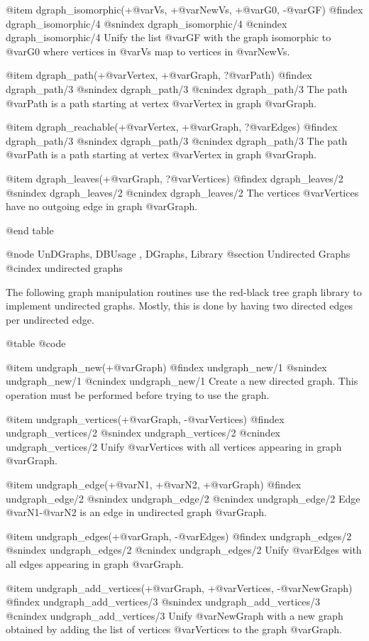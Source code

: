 {{{{{{{{@item dgraph_isomorphic(+@var{Vs}, +@var{NewVs}, +@var{G0}, -@var{GF})
@findex  dgraph_isomorphic/4
@snindex dgraph_isomorphic/4
@cnindex dgraph_isomorphic/4
Unify the list @var{GF} with the graph isomorphic to @var{G0} where 
vertices in @var{Vs} map to vertices in @var{NewVs}.

@item dgraph_path(+@var{Vertex}, +@var{Graph}, ?@var{Path})
@findex  dgraph_path/3
@snindex dgraph_path/3
@cnindex dgraph_path/3
The path @var{Path} is a path starting at vertex @var{Vertex} in graph
@var{Graph}.

@item dgraph_reachable(+@var{Vertex}, +@var{Graph}, ?@var{Edges})
@findex  dgraph_path/3
@snindex dgraph_path/3
@cnindex dgraph_path/3
The path @var{Path} is a path starting at vertex @var{Vertex} in graph
@var{Graph}.

@item dgraph_leaves(+@var{Graph}, ?@var{Vertices})
@findex  dgraph_leaves/2
@snindex dgraph_leaves/2
@cnindex dgraph_leaves/2
The vertices @var{Vertices} have no outgoing edge in graph
@var{Graph}.

@end table

@node UnDGraphs, DBUsage , DGraphs, Library
@section Undirected Graphs
@cindex undirected graphs

The following graph manipulation routines use the red-black tree graph
library to implement undirected graphs. Mostly, this is done by having
two directed edges per undirected edge.

@table @code

@item undgraph_new(+@var{Graph})
@findex  undgraph_new/1
@snindex undgraph_new/1
@cnindex undgraph_new/1
Create a new directed graph. This operation must be performed before
trying to use the graph.

@item undgraph_vertices(+@var{Graph}, -@var{Vertices})
@findex  undgraph_vertices/2
@snindex undgraph_vertices/2
@cnindex undgraph_vertices/2
Unify @var{Vertices} with all vertices appearing in graph
@var{Graph}.

@item undgraph_edge(+@var{N1}, +@var{N2}, +@var{Graph})
@findex  undgraph_edge/2
@snindex undgraph_edge/2
@cnindex undgraph_edge/2
Edge @var{N1}-@var{N2} is an edge in undirected graph @var{Graph}.

@item undgraph_edges(+@var{Graph}, -@var{Edges})
@findex  undgraph_edges/2
@snindex undgraph_edges/2
@cnindex undgraph_edges/2
Unify @var{Edges} with all edges appearing in graph
@var{Graph}.

@item undgraph_add_vertices(+@var{Graph}, +@var{Vertices}, -@var{NewGraph})
@findex  undgraph_add_vertices/3
@snindex undgraph_add_vertices/3
@cnindex undgraph_add_vertices/3
Unify @var{NewGraph} with a new graph obtained by adding the list of
vertices @var{Vertices} to the graph @var{Graph}.

}}}}}}}}
